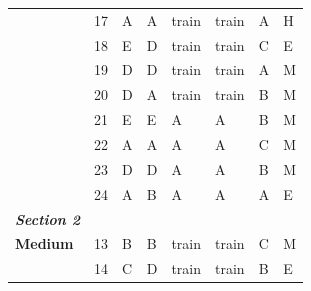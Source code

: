 \documentclass[pageno]{jpaper}
\newcommand{\textbi}[1]{\textbf{\textit{#1}}}
\begin{document}
\begin{table}[]
\begin{tabular}{llllllll}
\textbf{}                & 17              & A                       & A                      & train                   & train                   & A                       & H                   \\
\textbf{}                & 18              & E                       & D                      & train                   & train                   & C                       & E                   \\
\textbf{}                & 19              & D                       & D                      & train                   & train                   & A                       & M                   \\
\textbf{}                & 20              & D                       & A                      & train                   & train                   & B                       & M                   \\
\textbf{}                & 21              & E                       & E                      & A                       & A                       & B                       & M                   \\
\textbf{}                & 22              & A                       & A                      & A                       & A                       & C                       & M                   \\
\textbf{}                & 23              & D                       & D                      & A                       & A                       & B                       & M                   \\
\textbf{}                & 24              & A                       & B                      & A                       & A                       & A                       & E                   \\ \midrule
\textbi{Section 2}       &                 &                         &                        &                         &                         &                         &                     \\ \midrule
\textbf{Medium}          & 13              & B                       & B                      & train                   & train                   & C                       & M                   \\
\textbf{}                & 14              & C                       & D                      & train                   & train                   & B                       & E                   \\

\end{tabular}
\end{table}
\end{document}
